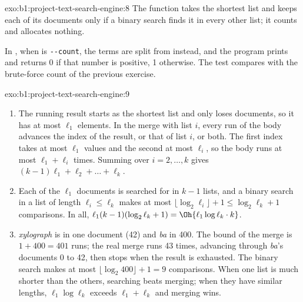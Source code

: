 \begin{solution}{exo:b1:project-text-search-engine:8}
The function takes the shortest list and keeps each of its documents only if a binary search finds it in every other
list; it counts and allocates nothing.


In , when  is \texttt{-{}-{}count}, the terms are split from  instead, and the program
prints  and returns 0 if that number is positive, 1 otherwise. The test compares
 with the brute-force count of the previous exercise.
\end{solution}

\begin{solution}{exo:b1:project-text-search-engine:9}
\begin{enumerate}
\item The running result starts as the shortest list and only loses documents, so it has at most $\ell_1$ elements.
In the merge with list $i$, every run of the body advances the index of the result, or that of list $i$, or both. The
first index takes at most $\ell_1$ values and the second at most $\ell_i$, so the body runs at most $\ell_1 + \ell_i$
times. Summing over $i = 2, \dots, k$ gives $(k - 1)\ell_1 + \ell_2 + \dots + \ell_k$.
\item Each of the $\ell_1$ documents is searched for in $k - 1$ lists, and a binary search in a list of length $\ell_i
\le \ell_k$ makes at most $\lfloor \log_2 \ell_i \rfloor + 1 \le \log_2 \ell_k + 1$ comparisons. In all, $\ell_1 (k -
1)(\log_2 \ell_k + 1) = \Oh{\ell_1 \log \ell_k \cdot k}$.
\item \emph{xylograph} is in one document (42) and \emph{ba} in 400. The bound of the merge is $1 + 400 = 401$ runs; the
real merge runs 43 times, advancing through \emph{ba}'s documents 0 to 42, then stops when the result is exhausted.
The binary search makes at most $\lfloor \log_2 400 \rfloor + 1 = 9$ comparisons. When one list is much shorter than
the others, searching beats merging; when they have similar lengths, $\ell_1 \log \ell_k$ exceeds $\ell_1 + \ell_k$
and merging wins.
\end{enumerate}
\end{solution}

